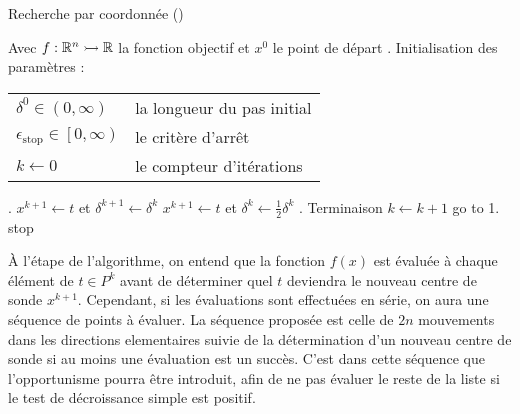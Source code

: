 \begin{algorithm}[H]
	\caption{\textsf{Recherche par coordonnée} (\CS)}
	\label{alg1}
	\begin{algorithmic}
		\STATE Avec $f:\mathbb{R}^n \rightarrowtail \mathbb{R}$ la fonction objectif et $x^0$ le point de départ
		. \textsf{Initialisation des paramètres} : 
		\bindent
		\STATE\begin{flushleft}
			\begin{tabular}{l l}
				$\delta^0 \in (0,\infty)$ & la longueur du pas initial\\
				$\epsilon_{\text{stop}} \in \left[ 0,\infty \right) $ & le critère d'arrêt\\
				$k \leftarrow 0$ & le compteur d'itérations\\
			\end{tabular}
		\end{flushleft}
		\eindent
		. \POLL
		\bindent
		\STATE $x^{k+1} \leftarrow t$ et $\delta^{k+1} \leftarrow \delta^k$
		\ELSE
		\STATE $x^{k+1} \leftarrow t$ et $\delta^{k} \leftarrow \frac{1}{2}\delta^k$
		\ENDIF
		\eindent
		. \textsf{Terminaison}
		\bindent
		\STATE $k\leftarrow k+1$
		\STATE go to 1.
		\ELSE
		\STATE stop
		\ENDIF
		\eindent
	\end{algorithmic}
\end{algorithm}
À l'étape \POLL de l'algorithme, on entend que la fonction $f(x)$ est évaluée à chaque élément de $t \in P^k$ avant de déterminer quel $t$ deviendra le nouveau centre de sonde $x^{k+1}$. Cependant, si les évaluations sont effectuées en série, on aura une séquence de points à évaluer. La séquence proposée est celle de $2n$ mouvements dans les directions elementaires suivie de la détermination d'un nouveau centre de sonde si au moins une évaluation est un succès. C'est dans cette séquence que l'opportunisme pourra être introduit, afin de ne pas évaluer le reste de la liste si le test de décroissance simple est positif.
